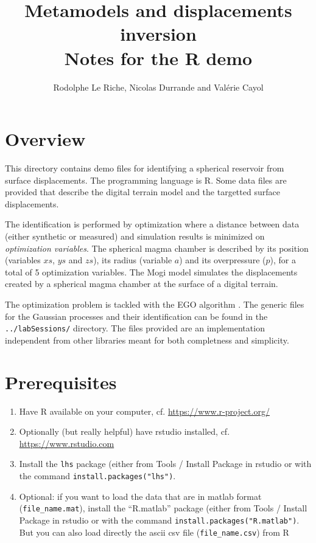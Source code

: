 \documentclass[12pt]{article}
\begin{document}
\title{Metamodels and displacements  inversion \\ Notes for the R demo}
\author{Rodolphe Le Riche, Nicolas Durrande and Valérie Cayol}
\maketitle

\section{Overview}
This directory contains demo files for identifying a spherical reservoir from surface displacements. The programming language is R. 
Some data files are provided that describe the digital terrain model and the targetted surface displacements.

The identification is performed by optimization where a distance between data (either synthetic or measured) 
and simulation results is minimized on \emph{optimization variables}. 
The spherical magma chamber is described by its position (variables $xs$, $ys$ and $zs$), its radius (variable $a$) and 
its overpressure ($p$), for a total of 5 optimization variables. The Mogi model \cite{Yamakawa1955,Mogi1958} simulates the displacements created 
by a spherical magma chamber at the surface of a digital terrain.

The optimization problem is tackled with the EGO algorithm \cite{Jones1998}. 
The generic files for the Gaussian processes and their identification can be found in the \texttt{../labSessions/} directory.
The files provided are an implementation independent from other libraries meant for both completness and simplicity.

\section{Prerequisites}
\begin{enumerate}
\item Have R available on your computer, cf. \url{https://www.r-project.org/}
\item Optionally (but really helpful) have rstudio installed, cf. \url{https://www.rstudio.com}
\item Install the \texttt{lhs} package (either from Tools / Install Package in rstudio or with the command \texttt{install.packages("lhs")}.
\item Optional: if you want to load the data that are in matlab format (\texttt{file\_name.mat}), 
install the ``R.matlab'' package (either from Tools / Install Package in rstudio or with the command \texttt{install.packages("R.matlab")}. But you can also load directly the ascii csv file (\texttt{file\_name.csv}) from R
\end{enumerate}
\end{document}
